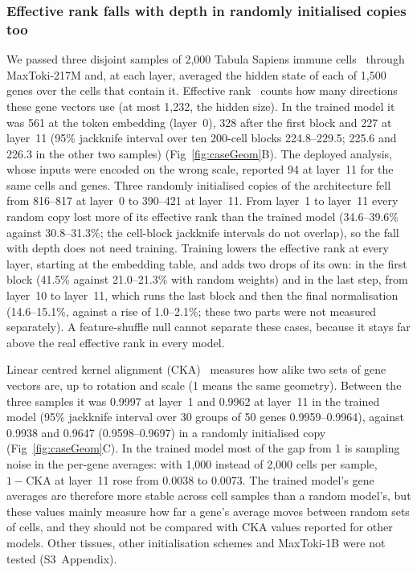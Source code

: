 \documentclass[10pt,letterpaper]{article}
\begin{document}
\subsubsection*{Effective rank falls with depth in randomly initialised copies too}
We passed three disjoint samples of 2,000 Tabula Sapiens immune
cells~\cite{tabulasapiens2022} through MaxToki-217M and, at each layer,
averaged the hidden state of each of 1,500 genes over the cells that
contain it. Effective rank~\cite{roy2007effective} counts how many
directions these gene vectors use (at most 1,232, the hidden size). In the
trained model it was 561 at the token embedding (layer~0), 328 after the
first block and 227 at layer~11 (95\% jackknife interval over ten
200-cell blocks 224.8--229.5; 225.6 and 226.3 in the other two samples)
(Fig~\ref{fig:caseGeom}B). The deployed analysis, whose inputs were
encoded on the wrong scale, reported 94 at layer~11 for the same cells
and genes. Three randomly initialised copies of the architecture fell
from 816--817 at layer~0 to 390--421 at layer~11. From layer~1 to
layer~11 every random copy lost more of its effective rank than the
trained model (34.6--39.6\% against 30.8--31.3\%; the cell-block
jackknife intervals do not overlap), so the fall with depth does not need
training. Training lowers the effective rank at every layer, starting at
the embedding table, and adds two drops of its own: in the first block
(41.5\% against 21.0--21.3\% with random weights) and in the last step,
from layer~10 to layer~11, which runs the last block and then the final
normalisation (14.6--15.1\%, against a rise of 1.0--2.1\%; these two
parts were not measured separately). A feature-shuffle null cannot
separate these cases, because it stays far above the real effective rank
in every model.

Linear centred kernel alignment (CKA)~\cite{kornblith2019cka} measures how alike two sets of gene
vectors are, up to rotation and scale (1 means the same geometry).
Between the three samples it was 0.9997 at layer~1 and 0.9962 at
layer~11 in the trained model (95\% jackknife interval over 30 groups of
50 genes 0.9959--0.9964), against 0.9938 and 0.9647 (0.9598--0.9697) in a
randomly initialised copy (Fig~\ref{fig:caseGeom}C). In the trained model
most of the gap from 1 is sampling noise in the per-gene averages: with
1,000 instead of 2,000 cells per sample, $1-\mathrm{CKA}$ at layer~11
rose from 0.0038 to 0.0073. The trained model's gene averages are
therefore more stable across cell samples than a random model's, but
these values mainly measure how far a gene's average moves between random
sets of cells, and they should not be compared with CKA values reported
for other models. Other tissues, other initialisation schemes and
MaxToki-1B were not tested (S3~Appendix).
\end{document}
